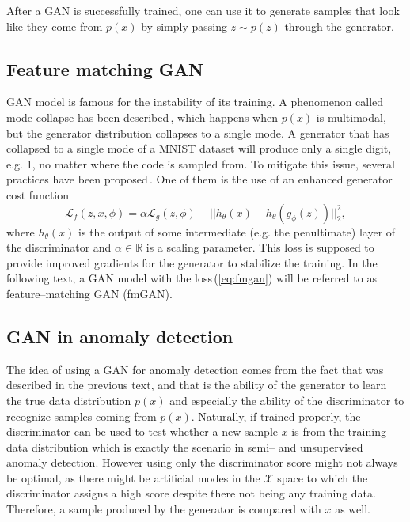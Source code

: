 After a GAN is successfully trained, one can use it to generate samples
that look like they come from $p(x)$ by simply passing $z\sim p(z)$
through the generator. 

\subsection{Feature matching GAN}

GAN model is famous for the instability of its training. A phenomenon
called mode collapse has been described\,\cite{goodfellow2016nips},
which happens when $p(x)$ is multimodal, but the generator distribution
collapses to a single mode. A generator that has collapsed to a single
mode of a MNIST dataset will produce only a single digit, e.g. 1,
no matter where the code is sampled from. To mitigate this issue,
several practices have been proposed\,\cite{salimans2016fmgan}.
One of them is the use of an enhanced generator cost function
\begin{equation}
\mathcal{L}_{f}(z,x,\phi)=\alpha\mathcal{L}_{g}(z,\phi)+||h_{\theta}(x)-h_{\theta}(g_{\phi}(z))||_{2}^{2},\label{eq:fmgan}
\end{equation}
where $h_{\theta}(x)$ is the output of some intermediate (e.g. the
penultimate) layer of the discriminator and $\alpha\in\mathbb{R}$
is a scaling parameter. This loss is supposed to provide improved
gradients for the generator to stabilize the training. In the following
text, a GAN model with the loss\,(\ref{eq:fmgan}) will be referred
to as feature--matching GAN (fmGAN).

\subsection{GAN in anomaly detection}

The idea of using a GAN for anomaly detection comes from the fact
that was described in the previous text, and that is the ability of
the generator to learn the true data distribution $p(x)$ and especially
the ability of the discriminator to recognize samples coming from
$p(x)$. Naturally, if trained properly, the discriminator can be
used to test whether a new sample $x$ is from the training data distribution
which is exactly the scenario in semi-- and unsupervised anomaly
detection. However using only the discriminator score might not always
be optimal, as there might be artificial modes in the $\mathcal{X}$
space to which the discriminator assigns a high score despite there
not being any training data. Therefore, a sample produced by the generator
is compared with $x$ as well.

